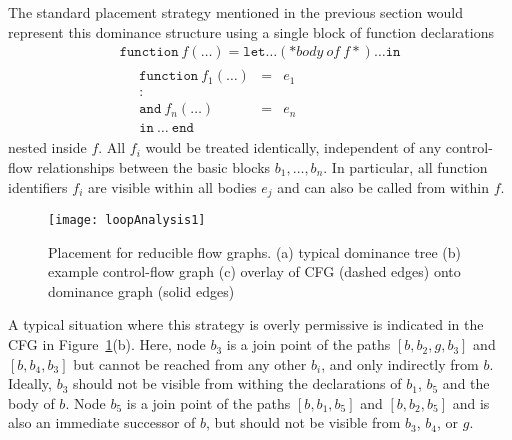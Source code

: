The standard placement strategy mentioned in the previous section
would represent this dominance structure
using a single block of function declarations
\begin{equation}
\label{sec:SSA:functiondeclarationblock}
\begin{array}{l}
  \mathtt{function}\ f (\ldots)= 
  \mathtt{let} \ldots (* \mathit{body\ of\ f}*)\ldots \mathtt{in}\\
  \quad \begin{array}{rcl}
            \mathtt{function}\ f_1(\ldots) & = & e_1\\
             : \\
            \mathtt{and}\ f_n(\ldots) & = & e_n\\
            \mathtt{in}\ \ldots\ \mathtt{end}
        \end{array}
  \end{array}
\end{equation}
nested inside $f$. All $f_i$ would be treated identically, independent
of any control-flow relationships between the basic blocks $b_1,
\ldots, b_n$. In particular, all function identifiers $f_i$ are
visible within all bodies $e_j$ and can also be called from within
$f$.

\begin{figure}
\begin{center}
\texttt{[image: loopAnalysis1]}
\end{center}
\caption{\label{FigLoopAnalysis1ReducibleGraph} Placement for reducible flow graphs. (a) typical dominance tree (b) example control-flow graph (c) overlay of CFG (dashed edges) onto dominance graph (solid edges) }
\end{figure}
A typical situation where this strategy is overly permissive is
indicated in the CFG in
Figure~\ref{FigLoopAnalysis1ReducibleGraph}(b). Here, node $b_3$ is a
join point of the paths $[b,b_2,g,b_3]$ and $[b,b_4,b_3]$ but cannot
be reached from any other $b_i$, and only indirectly from $b$.
Ideally, $b_3$ should not be visible from withing the declarations of
$b_1$, $b_5$ and the body of $b$. Node $b_5$ is a join point of the
paths $[b,b_1,b_5]$ and $[b,b_2,b_5]$ and is also an immediate
successor of $b$, but should not be visible from $b_3$, $b_4$, or $g$.

